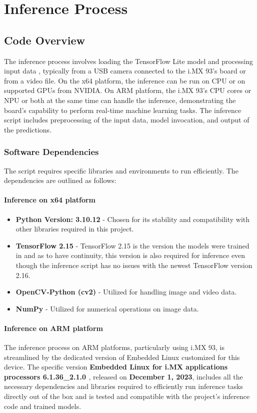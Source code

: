 \chapter{Inference Process}

\section{Code Overview}
The inference process involves loading the TensorFlow Lite model and processing input data \cite{gajdosik2024gesture}, typically from a USB camera connected to the i.MX 93's board or from a video file. On the x64 platform, the inference can be run on CPU or on supported GPUs from NVIDIA. On ARM platform, the i.MX 93's CPU cores or NPU or both at the same time can handle the inference, demonstrating the board's capability to perform real-time machine learning tasks. The inference script includes preprocessing of the input data, model invocation, and output of the predictions.

\subsection{Software Dependencies}
The script requires specific libraries and environments to run efficiently. The dependencies are outlined as follows:

\subsubsection{Inference on x64 platform}

\begin{itemize}
    \item \textbf{Python Version: 3.10.12} - Chosen for its stability and compatibility with other libraries required in this project.
    \item \textbf{TensorFlow 2.15} - TensorFlow 2.15 is the version the models were trained in and as to have continuity, this version is also required for inference even though the inference script has no issues with the newest TensorFlow version 2.16.
    \item \textbf{OpenCV-Python (cv2)} - Utilized for handling image and video data.
    \item \textbf{NumPy} - Utilized for numerical operations on image data.
\end{itemize}

\subsubsection{Inference on ARM platform}
The inference process on ARM platforms, particularly using i.MX 93, is streamlined by the dedicated version of Embedded Linux customized for this device. The specific version \textbf{Embedded Linux for i.MX applications processors 6.1.36\_2.1.0 \cite{iMX_LINUX_EMBEDDED}}, released on \textbf{December 1, 2023}, includes all the necessary dependencies and libraries required to efficiently run inference tasks directly out of the box and is tested and compatible with the project's inference code and trained models.

